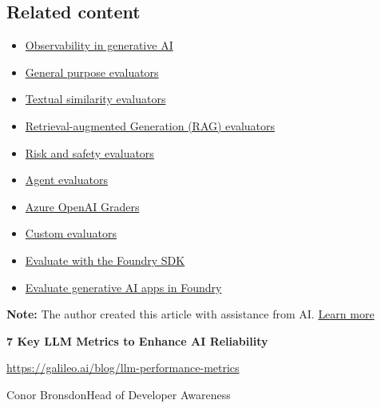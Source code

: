 \documentclass[
  letterpaper,
  DIV=11,
  numbers=noendperiod,
  oneside]{scrreprt}
\begin{document}
\begin{tcolorbox}
\section{Related content}\label{related-content}

\begin{itemize}
\item
  \href{https://learn.microsoft.com/en-us/azure/foundry/concepts/observability}{Observability
  in generative AI}
\item
  \href{https://learn.microsoft.com/en-us/azure/foundry/concepts/evaluation-evaluators/general-purpose-evaluators}{General
  purpose evaluators}
\item
  \href{https://learn.microsoft.com/en-us/azure/foundry/concepts/evaluation-evaluators/textual-similarity-evaluators}{Textual
  similarity evaluators}
\item
  \href{https://learn.microsoft.com/en-us/azure/foundry/concepts/evaluation-evaluators/rag-evaluators}{Retrieval-augmented
  Generation (RAG) evaluators}
\item
  \href{https://learn.microsoft.com/en-us/azure/foundry/concepts/evaluation-evaluators/risk-safety-evaluators}{Risk
  and safety evaluators}
\item
  \href{https://learn.microsoft.com/en-us/azure/foundry/concepts/evaluation-evaluators/agent-evaluators}{Agent
  evaluators}
\item
  \href{https://learn.microsoft.com/en-us/azure/foundry/concepts/evaluation-evaluators/azure-openai-graders}{Azure
  OpenAI Graders}
\item
  \href{https://learn.microsoft.com/en-us/azure/foundry/concepts/evaluation-evaluators/custom-evaluators}{Custom
  evaluators}
\item
  \href{https://learn.microsoft.com/en-us/azure/foundry-classic/how-to/develop/evaluate-sdk}{Evaluate
  with the Foundry SDK}
\item
  \href{https://learn.microsoft.com/en-us/azure/foundry/how-to/evaluate-generative-ai-app}{Evaluate
  generative AI apps in Foundry}
\end{itemize}

\textbf{Note:} The author created this article with assistance from AI.
\href{https://learn.microsoft.com/principles-for-ai-generated-content}{Learn
more}

\textbf{7 Key LLM Metrics to Enhance AI Reliability}

\url{https://galileo.ai/blog/llm-performance-metrics}

Conor BronsdonHead of Developer Awareness


\end{tcolorbox}
\end{document}
